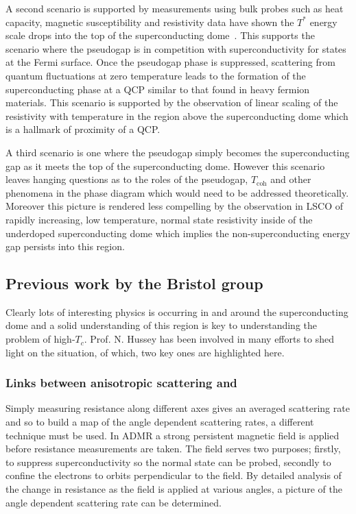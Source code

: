 A second scenario is supported by measurements using bulk probes such as heat capacity, magnetic susceptibility and resistivity data have shown the $T^*$ energy scale drops into the top of the superconducting dome~\cite{Tallon2001}. This supports the scenario where the pseudogap is in competition with superconductivity for states at the Fermi surface. Once the pseudogap phase is suppressed, scattering from quantum fluctuations at zero temperature leads to the formation of the superconducting phase at a \ac{QCP} similar to that found in heavy fermion materials. This scenario is supported by the observation of linear scaling of the resistivity with temperature in the region above the superconducting dome which is a hallmark of proximity of a \ac{QCP}.

A third scenario is one where the pseudogap simply becomes the superconducting gap as it meets the top of the superconducting dome. However this scenario leaves hanging questions as to the roles of the pseudogap, $T_{\textrm{coh}}$ and other phenomena in the phase diagram which would need to be addressed theoretically. Moreover this picture is rendered less compelling by the observation in \ac{LSCO} of rapidly increasing, low temperature, normal state resistivity inside of the underdoped superconducting dome which implies the non-superconducting energy gap persists into this region.


\subsection{Previous work by the Bristol group}

Clearly lots of interesting physics is occurring in and around the superconducting dome and a solid understanding of this region is key to understanding the problem of high-$T_c$. Prof. N. Hussey has been involved in many efforts to shed light on the situation, of which, two key ones are highlighted here.

\subsubsection{Links between anisotropic scattering and \Tc}

Simply measuring resistance along different axes gives an averaged scattering rate and so to build a map of the angle dependent scattering rates, a different technique must be used. In \ac{ADMR} a strong persistent magnetic field is applied before resistance measurements are taken. The field serves two purposes; firstly, to suppress superconductivity so the normal state can be probed, secondly to confine the electrons to orbits perpendicular to the field. By detailed analysis of the change in resistance as the field is applied at various angles, a picture of the angle dependent scattering rate can be determined.

